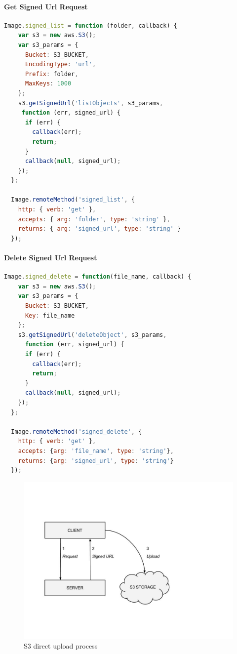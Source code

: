 \paragraph{Get Signed Url Request}

\begin{lstlisting}[language=javascript]
Image.signed_list = function (folder, callback) {
    var s3 = new aws.S3();
    var s3_params = {
      Bucket: S3_BUCKET,
      EncodingType: 'url',
      Prefix: folder,
      MaxKeys: 1000
    };
    s3.getSignedUrl('listObjects', s3_params,
     function (err, signed_url) {
      if (err) {
        callback(err);
        return;
      }
      callback(null, signed_url);
    });
  };

  Image.remoteMethod('signed_list', {
    http: { verb: 'get' },
    accepts: { arg: 'folder', type: 'string' },
    returns: { arg: 'signed_url', type: 'string' }
  });
\end{lstlisting}


\paragraph{Delete Signed Url Request}

\begin{lstlisting}[language=javascript]
Image.signed_delete = function(file_name, callback) {
    var s3 = new aws.S3();
    var s3_params = {
      Bucket: S3_BUCKET,
      Key: file_name
    };
    s3.getSignedUrl('deleteObject', s3_params,
      function (err, signed_url) {
      if (err) {
        callback(err);
        return;
      }
      callback(null, signed_url);
    });
  };

  Image.remoteMethod('signed_delete', {
    http: { verb: 'get' },
    accepts: {arg: 'file_name', type: 'string'},
    returns: {arg: 'signed_url', type: 'string'}
  });

\end{lstlisting}


\begin {figure}[h]
\graphicspath{{images/chapter_s3/}}
\includegraphics[width=\textwidth]{s3_upload}
\caption{S3 direct upload process}
\end {figure}



